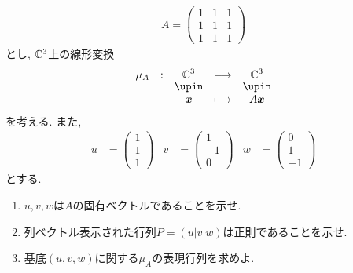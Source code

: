 \section{}
\begin{quiz}
  \begin{align*}
    A=
    \begin{pmatrix}
      1&1&1\\
      1&1&1\\
      1&1&1
    \end{pmatrix}
  \end{align*}
  とし, $\mathbb{C}^3$上の線形変換
  \begin{align*}
    \shazo{\mu_A}{\CC^3}{\CC^3}
    {\xx}{A\xx}
  \end{align*}
  を考える. また,
  \begin{align*}
    u&=\begin{pmatrix}1\\1\\1\end{pmatrix}&
    v&=\begin{pmatrix}1\\-1\\0\end{pmatrix}&
    w&=\begin{pmatrix}0\\1\\-1\end{pmatrix}
  \end{align*}
  とする.
  \begin{enumerate}
  \item $u,v,w$は$A$の固有ベクトルであることを示せ.
  \item 列ベクトル表示された行列$P=(u|v|w)$は正則であることを示せ.
  \item 基底$(u,v,w)$に関する$\mu_A$の表現行列を求めよ.
  \end{enumerate}
\end{quiz}

